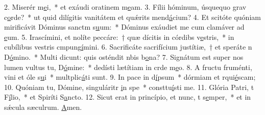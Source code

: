 2. Miserér m\uline{e}i,~* et exáudi oratinem m\uline{e}am.
3. Fílii hóminum, úsquequo grav c\uline{o}rde?~* ut quid dilígitis vanitátem et quǽrits mend\uline{á}cium?
4. Et scitóte quóniam mirificávit Dóminus sanctm s\uline{u}um:~* Dóminus exáudiet me cum clamáver ad \uline{e}um.
5. Irascímini, et nolíte peccáre:~† quæ dícitis in córdibs v\uline{e}stris,~* in cubílibus vestris cmpung\uline{í}mini.
6. Sacrificáte sacrifícium justítiæ,~† et speráte n D\uline{ó}mino.~* Multi dicunt: quis osténdit nbis b\uline{o}na?
7. Signátum est super nos lumen vultus tu, D\uline{ó}mine:~* dedísti lætítiam in crde m\uline{e}o.
8. A fructu fruménti, vini et óle s\uline{u}i~* multplic\uline{á}ti sunt.
9. In pace in d\uline{í}psum~* dórmiam et rqui\uline{é}scam;
10. Quóniam tu, Dómine, singuláritr \uline{i}n spe~* consttu\uline{í}sti me.
11. Glória Patri, t F\uline{í}lio,~* et Spiríti S\uline{a}ncto.
12. Sicut erat in princípio, et nunc, t s\uline{e}mper,~* et in sǽcula sæculrum. \uline{A}men.
